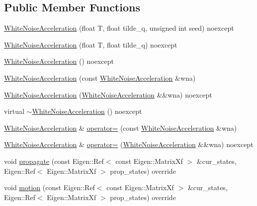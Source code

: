 \subsection*{Public Member Functions}
\begin{DoxyCompactItemize}
\item 
\mbox{\hyperlink{classbfl_1_1WhiteNoiseAcceleration_a5eb5d6b767ad37ecc93e0ce1dd944e8a}{White\+Noise\+Acceleration}} (float T, float tilde\+\_\+q, unsigned int seed) noexcept
\item 
\mbox{\hyperlink{classbfl_1_1WhiteNoiseAcceleration_a689e238bdbd0ccaf488e8a1c9e897825}{White\+Noise\+Acceleration}} (float T, float tilde\+\_\+q) noexcept
\item 
\mbox{\hyperlink{classbfl_1_1WhiteNoiseAcceleration_aae68b94c0d82a6fa594e0e1feba7e272}{White\+Noise\+Acceleration}} () noexcept
\item 
\mbox{\hyperlink{classbfl_1_1WhiteNoiseAcceleration_ac01e4702a8fbce92a7fd0adf74472e5a}{White\+Noise\+Acceleration}} (const \mbox{\hyperlink{classbfl_1_1WhiteNoiseAcceleration}{White\+Noise\+Acceleration}} \&wna)
\item 
\mbox{\hyperlink{classbfl_1_1WhiteNoiseAcceleration_a74f0f6d44c76e10627765d405de96af6}{White\+Noise\+Acceleration}} (\mbox{\hyperlink{classbfl_1_1WhiteNoiseAcceleration}{White\+Noise\+Acceleration}} \&\&wna) noexcept
\item 
virtual \mbox{\hyperlink{classbfl_1_1WhiteNoiseAcceleration_a17d13fe4ece8cb6db9f2423ff48f817d}{$\sim$\+White\+Noise\+Acceleration}} () noexcept
\item 
\mbox{\hyperlink{classbfl_1_1WhiteNoiseAcceleration}{White\+Noise\+Acceleration}} \& \mbox{\hyperlink{classbfl_1_1WhiteNoiseAcceleration_a6f69d09499e7a4746bd823db5fc5ceec}{operator=}} (const \mbox{\hyperlink{classbfl_1_1WhiteNoiseAcceleration}{White\+Noise\+Acceleration}} \&wna)
\item 
\mbox{\hyperlink{classbfl_1_1WhiteNoiseAcceleration}{White\+Noise\+Acceleration}} \& \mbox{\hyperlink{classbfl_1_1WhiteNoiseAcceleration_a4562a1dfc45dd143f7d05fea98e38f42}{operator=}} (\mbox{\hyperlink{classbfl_1_1WhiteNoiseAcceleration}{White\+Noise\+Acceleration}} \&\&wna) noexcept
\item 
void \mbox{\hyperlink{classbfl_1_1WhiteNoiseAcceleration_a1c2f938f535c20c78447a69c76c6896b}{propagate}} (const Eigen\+::\+Ref$<$ const Eigen\+::\+Matrix\+Xf $>$ \&cur\+\_\+states, Eigen\+::\+Ref$<$ Eigen\+::\+Matrix\+Xf $>$ prop\+\_\+states) override
\item 
void \mbox{\hyperlink{classbfl_1_1WhiteNoiseAcceleration_addb79c08bdf08b89629bdcd24e46d1b8}{motion}} (const Eigen\+::\+Ref$<$ const Eigen\+::\+Matrix\+Xf $>$ \&cur\+\_\+states, Eigen\+::\+Ref$<$ Eigen\+::\+Matrix\+Xf $>$ prop\+\_\+states) override

\end{DoxyCompactItemize}
